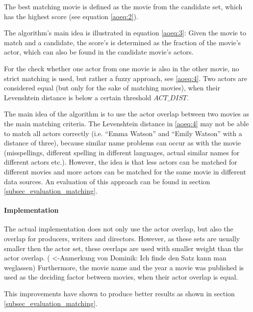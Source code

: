 The best matching movie is defined as the movie from the candidate set, which has the highest score (see equation \ref{aoeq:2}).

The algorithm's main idea is illustrated in equation \ref{aoeq:3}: Given the movie to match and a candidate, the score's is determined as the fraction of the movie's actor, which can also be found in the candidate movie's actors.

For the check whether one actor from one movie is also in the other movie, no strict matching is used, but rather a fuzzy approach, see \ref{aoeq:4}.
Two actors are considered equal (but only for the sake of matching movies), when their Levenshtein distance is below a certain threshold $ACT\_DIST$.

The main idea of the algorithm is to use the actor overlap between two movies as the main matching criteria.
The Levenshtein distance in \ref{aoeq:4} may not be able to match all actors correctly (i.e. "`Emma Watson"' and "`Emily Watson"' with a distance of three), because similar name problems can occur as with the movie (misspellings, different spelling in different languages, actual similar names for different actors etc.).
However, the idea is that less actors can be matched for different movies and more actors can be matched for the same movie in different data sources.
An evaluation of this approach can be found in section \ref{subsec_evaluation_matching}.

\paragraph{Implementation}
The actual implementation does not only use the actor overlap, but also the overlap for producers, writers and directors.
However, as these sets are usually smaller then the actor set, these overlaps are used with smaller weight than the actor overlap. ( <-Anmerkung von Dominik: Ich finde den Satz kann man weglassen)
Furthermore, the movie name and the year a movie was published is used as the deciding factor between movies, when their actor overlap is equal.

This improvements have shown to produce better results as shown in section \ref{subsec_evaluation_matching}.
